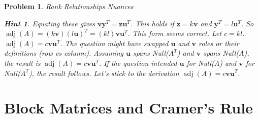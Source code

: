\documentclass[12pt]{article}
\newtheorem{problem}{Problem}[section]
\theoremstyle{definition}
\newtheorem{hint}{Hint}[question]
\newcommand{\adj}{\operatorname{adj}}
\newcommand{\vect}[1]{\mathbf{#1}} %
\begin{document}
\begin{problem}{Rank Relationships Nuances}
\begin{hint}
        Equating these gives $\vect{v} \vect{y}^T = \vect{z} \vect{u}^T$. This holds if $\vect{z}= k \vect{v}$ and $\vect{y}^T = l \vect{u}^T$.
        So $\adj(A) = (k\vect{v}) (l \vect{u})^T = (kl) \vect{v} \vect{u}^T$. This form seems correct. Let $c = kl$. $\adj(A) = c \vect{v} \vect{u}^T$.
        The question might have swapped $\vect{u}$ and $\vect{v}$ roles or their definitions (row vs column). Assuming $\vect{u}$ spans Null($A^T$) and $\vect{v}$ spans Null($A$), the result is $\adj(A) = c \vect{v} \vect{u}^T$. If the question intended $\vect{u}$ for Null($A$) and $\vect{v}$ for Null($A^T$), the result follows. Let's stick to the derivation $\adj(A) = c \vect{v} \vect{u}^T$.
    \end{hint}
\end{problem}

\section{Block Matrices and Cramer's Rule}
\end{document}
